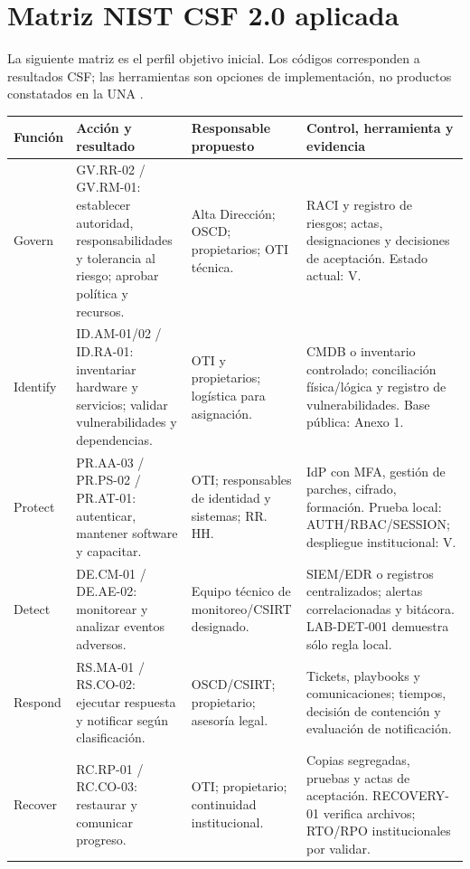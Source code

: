 \documentclass[10pt,a4paper]{article}
\newcommand{\cabecera}[1]{\textbf{#1}}
\begin{document}
\section{Matriz NIST CSF 2.0 aplicada}
La siguiente matriz es el perfil objetivo inicial. Los códigos corresponden a resultados CSF; las herramientas son opciones de implementación, no productos constatados en la UNA \cite{R03}.
\begin{TablaCompacta}
\begin{longtable}{P{25mm}P{48mm}P{39mm}P{47mm}}
\toprule\cabecera{Función} & \cabecera{Acción y resultado} & \cabecera{Responsable propuesto} & \cabecera{Control, herramienta y evidencia}\\\midrule\endhead
Govern & GV.RR-02 / GV.RM-01: establecer autoridad, responsabilidades y tolerancia al riesgo; aprobar política y recursos. & Alta Dirección; OSCD; propietarios; OTI técnica. & RACI y registro de riesgos; actas, designaciones y decisiones de aceptación. Estado actual: V.\\
Identify & ID.AM-01/02 / ID.RA-01: inventariar hardware y servicios; validar vulnerabilidades y dependencias. & OTI y propietarios; logística para asignación. & CMDB o inventario controlado; conciliación física/lógica y registro de vulnerabilidades. Base pública: Anexo 1.\\
Protect & PR.AA-03 / PR.PS-02 / PR.AT-01: autenticar, mantener software y capacitar. & OTI; responsables de identidad y sistemas; RR. HH. & IdP con MFA, gestión de parches, cifrado, formación. Prueba local: AUTH/RBAC/SESSION; despliegue institucional: V.\\
Detect & DE.CM-01 / DE.AE-02: monitorear y analizar eventos adversos. & Equipo técnico de monitoreo/CSIRT designado. & SIEM/EDR o registros centralizados; alertas correlacionadas y bitácora. LAB-DET-001 demuestra sólo regla local.\\
Respond & RS.MA-01 / RS.CO-02: ejecutar respuesta y notificar según clasificación. & OSCD/CSIRT; propietario; asesoría legal. & Tickets, playbooks y comunicaciones; tiempos, decisión de contención y evaluación de notificación.\\
Recover & RC.RP-01 / RC.CO-03: restaurar y comunicar progreso. & OTI; propietario; continuidad institucional. & Copias segregadas, pruebas y actas de aceptación. RECOVERY-01 verifica archivos; RTO/RPO institucionales por validar.\\\bottomrule
\end{longtable}
\end{TablaCompacta}
\end{document}
